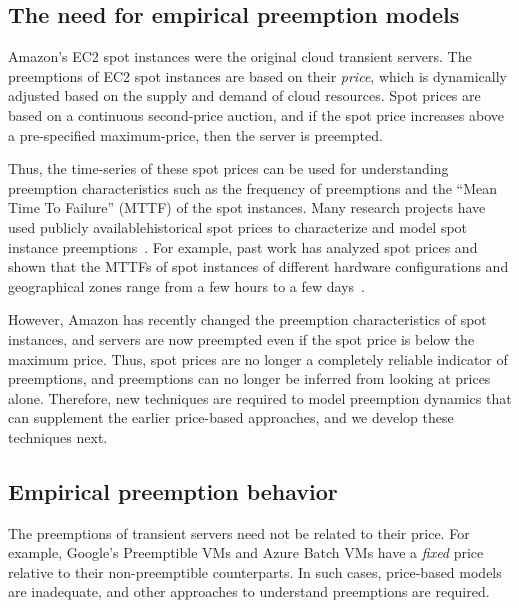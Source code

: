 \subsection{The need for empirical preemption models}
\label{subsec:need-for-empirical}

Amazon's EC2 spot instances were the original cloud transient servers.
The preemptions of EC2 spot instances are based on their \emph{price}, which is dynamically adjusted based on the supply and demand of cloud resources.
Spot prices are based on a continuous second-price auction, and if the spot price increases above a pre-specified maximum-price, then the server is preempted.

Thus, the time-series of these spot prices can be used for understanding preemption characteristics such as the frequency of preemptions and the ``Mean Time To Failure'' (MTTF) of the spot instances.
Many research projects have used publicly available\footnotemark historical spot prices to characterize and model spot instance preemptions~\cite{spotcheck,how-to-bid}. %
For example, past work has analyzed spot prices and shown that the MTTFs of spot instances of different hardware configurations and geographical zones range from a few hours to a few days~\cite{prateek-thesis, shastri-thesis}. 



However, Amazon has recently changed the preemption characteristics of spot instances, and servers are now preempted even if the spot price is below the maximum price.
Thus, spot prices are no longer a completely reliable indicator of preemptions, and preemptions can no longer be inferred from looking at prices alone.
Therefore, new techniques are required to model preemption dynamics that can supplement the earlier price-based approaches, and we develop these techniques next.


\subsection{Empirical preemption behavior}

The preemptions of transient servers need not be related to their price.
For example, Google's Preemptible VMs and Azure Batch VMs have a \emph{fixed} price relative to their non-preemptible counterparts. 
In such cases, price-based models are inadequate, and other approaches to understand preemptions are required.

